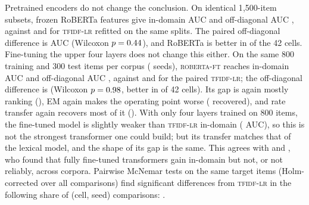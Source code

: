 Pretrained encoders do not change the conclusion. On identical 1{,}500-item subsets, frozen RoBERTa features give in-domain AUC \RobInAUC{} and off-diagonal AUC \RobOffAUC{}, against \SubLRInAUC{} and \SubLROffAUC{} for \textsc{tfidf-lr} refitted on the same splits. The paired off-diagonal difference is \RobMinusLRoff{} AUC (Wilcoxon $p=0.44$), and RoBERTa is better in \RobBetterCells{} of the 42 cells. Fine-tuning the upper four layers does not change this either. On the same 800 training and 300 test items per corpus (\FTseeds{} seeds), \textsc{roberta-ft} reaches in-domain AUC \FTInAUC{} and off-diagonal AUC \FTOffAUC{}, against \FTsubInAUC{} and \FTsubOffAUC{} for the paired \textsc{tfidf-lr}; the off-diagonal difference is \FTminusLRoff{} (Wilcoxon $p=0.98$, better in \FTbetterCells{} of 42 cells). Its gap is again mostly ranking (\FTRankShare), EM again makes the operating point worse (\FTRecEM{} recovered), and rate transfer again recovers most of it (\FTRecRank). With only four layers trained on 800 items, the fine-tuned model is slightly weaker than \textsc{tfidf-lr} in-domain (\FTminusLRin{} AUC), so this is not the strongest transformer one could build; but its transfer matches that of the lexical model, and the shape of its gap is the same. This agrees with \citet{verma2026audit} and \citet{delloglio2026comparison}, who found that fully fine-tuned transformers gain in-domain but not, or not reliably, across corpora. Pairwise McNemar tests on the same target items (Holm-corrected over all comparisons) find significant differences from \textsc{tfidf-lr} in the following share of (cell, seed) comparisons: \McFracSig.

